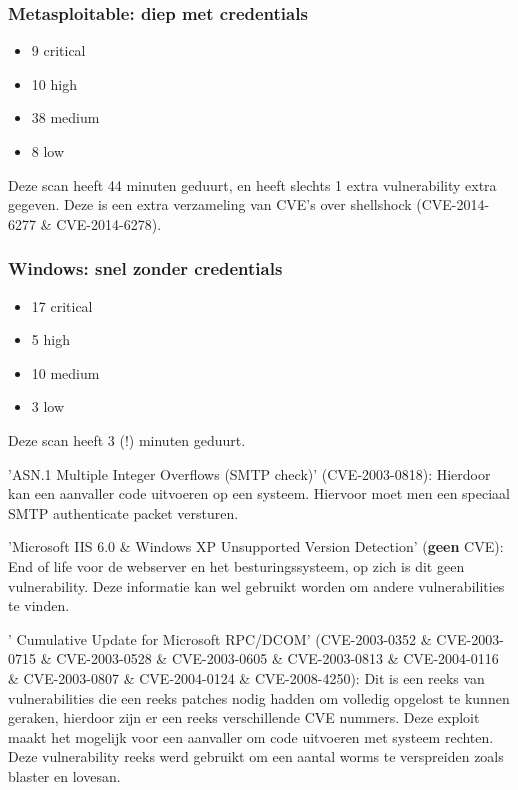\subsubsection{Metasploitable: diep met credentials}

\begin{itemize}
\item 9 critical
\item 10 high
\item 38 medium
\item 8 low
\end{itemize}

Deze scan heeft  44 minuten geduurt, en heeft slechts 1 extra vulnerability extra gegeven. Deze is een extra verzameling van CVE's over shellshock (CVE-2014-6277 \& CVE-2014-6278).

\subsubsection{Windows: snel zonder credentials}

\begin{itemize}
\item 17 critical
\item 5 high
\item 10 medium
\item 3 low
\end{itemize}

Deze scan heeft 3 (!) minuten geduurt.

'ASN.1 Multiple Integer Overflows (SMTP check)' (CVE-2003-0818): Hierdoor kan een aanvaller code uitvoeren op een systeem. Hiervoor moet men een speciaal SMTP authenticate packet versturen.

'Microsoft IIS 6.0 \& Windows XP Unsupported Version Detection' (\textbf{geen} CVE): End of life voor de webserver en het besturingssysteem, op zich is dit geen vulnerability. Deze informatie kan wel gebruikt worden om andere vulnerabilities te vinden.

' Cumulative Update for Microsoft RPC/DCOM' (CVE-2003-0352 \& CVE-2003-0715 \& CVE-2003-0528 \& CVE-2003-0605 \& CVE-2003-0813 \& CVE-2004-0116 \& CVE-2003-0807 \& CVE-2004-0124 \& CVE-2008-4250): Dit is een reeks van vulnerabilities die een reeks patches nodig hadden om volledig opgelost te kunnen geraken, hierdoor zijn er een reeks verschillende CVE nummers. Deze exploit maakt het mogelijk voor een aanvaller om code uitvoeren met systeem rechten. Deze vulnerability reeks werd gebruikt om een aantal worms te verspreiden zoals blaster en lovesan.

